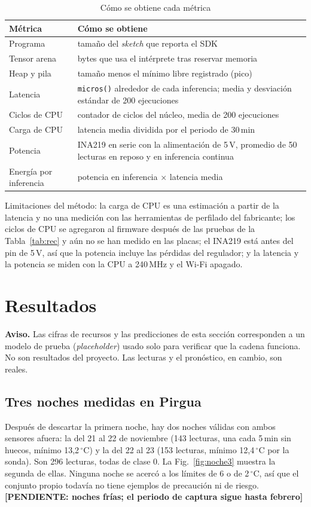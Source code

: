 \documentclass[conference]{IEEEtran}
\newcommand{\pend}[1]{\textcolor{red!70!black}{\textbf{[PENDIENTE: #1]}}}
\begin{document}
\begin{table}[t]
\caption{C\'omo se obtiene cada m\'etrica}
\label{tab:met}
\centering
\small
\begin{tabular}{@{}>{\raggedright}p{2.3cm}>{\raggedright\arraybackslash}p{5.3cm}@{}}
\toprule
M\'etrica & C\'omo se obtiene \\
\midrule
Programa & tama\~no del \textit{sketch} que reporta el SDK \\
Tensor arena & bytes que usa el int\'erprete tras reservar memoria \\
Heap y pila & tama\~no menos el m\'inimo libre registrado (pico) \\
Latencia & \texttt{micros()} alrededor de cada inferencia; media y desviaci\'on est\'andar de 200 ejecuciones \\
Ciclos de CPU & contador de ciclos del n\'ucleo, media de 200 ejecuciones \\
Carga de CPU & latencia media dividida por el periodo de 30\,min \\
Potencia & INA219 en serie con la alimentaci\'on de 5\,V, promedio de 50 lecturas en reposo y en inferencia continua \\
Energ\'ia por inferencia & potencia en inferencia $\times$ latencia media \\
\bottomrule
\end{tabular}
\end{table}

Limitaciones del m\'etodo: la carga de CPU es una estimaci\'on a partir de la latencia y no una medici\'on con las herramientas de perfilado del fabricante; los ciclos de CPU se agregaron al firmware despu\'es de las pruebas de la Tabla~\ref{tab:rec} y a\'un no se han medido en las placas; el INA219 est\'a antes del pin de 5\,V, as\'i que la potencia incluye las p\'erdidas del regulador; y la latencia y la potencia se miden con la CPU a 240\,MHz y el Wi-Fi apagado.

\section{Resultados}
\textbf{Aviso.} Las cifras de recursos y las predicciones de esta secci\'on corresponden a un modelo de prueba (\textit{placeholder}) usado solo para verificar que la cadena funciona. No son resultados del proyecto. Las lecturas y el pron\'ostico, en cambio, son reales.

\subsection{Tres noches medidas en Pirgua}
Despu\'es de descartar la primera noche, hay dos noches v\'alidas con ambos sensores afuera: la del 21 al 22 de noviembre (143 lecturas, una cada 5\,min sin huecos, m\'inimo 13,2\,$^\circ$C) y la del 22 al 23 (153 lecturas, m\'inimo 12,4\,$^\circ$C por la sonda). Son 296 lecturas, todas de clase 0. La Fig.~\ref{fig:noche3} muestra la segunda de ellas. Ninguna noche se acerc\'o a los l\'imites de 6 o de 2\,$^\circ$C, as\'i que el conjunto propio todav\'ia no tiene ejemplos de precauci\'on ni de riesgo. \pend{noches fr\'ias; el periodo de captura sigue hasta febrero}
\end{document}
